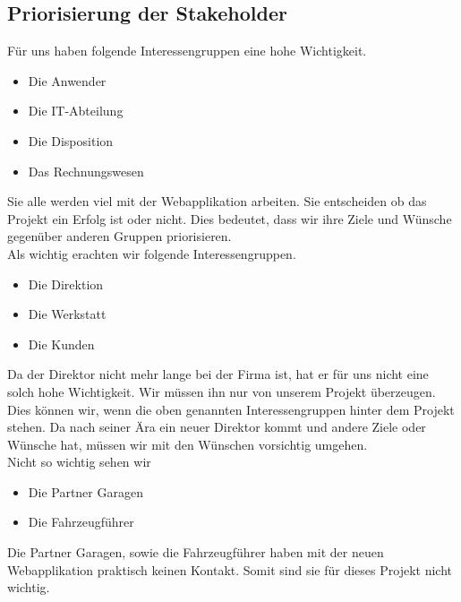 \subsection{Priorisierung der Stakeholder}
Für uns haben folgende Interessengruppen eine hohe Wichtigkeit.
\begin{itemize}
\item Die Anwender
\item Die IT-Abteilung
\item Die Disposition
\item Das Rechnungswesen
\end{itemize}
%
Sie alle werden viel mit der Webapplikation arbeiten. Sie entscheiden ob das Projekt ein Erfolg ist oder nicht. Dies bedeutet, dass wir ihre Ziele und Wünsche gegenüber anderen Gruppen priorisieren.\\[2ex]
%
Als wichtig erachten wir folgende Interessengruppen.
\begin{itemize}
\item Die Direktion
\item Die Werkstatt
\item Die Kunden
\end{itemize}
%
Da der Direktor nicht mehr lange bei der Firma ist, hat er für uns nicht eine solch hohe Wichtigkeit. Wir müssen ihn nur von unserem Projekt überzeugen. Dies können wir, wenn die oben genannten Interessengruppen hinter dem Projekt stehen. Da nach seiner Ära ein neuer Direktor kommt und andere Ziele oder Wünsche hat, müssen wir mit den Wünschen vorsichtig umgehen.\\[2ex]
%
Nicht so wichtig sehen wir
\begin{itemize}
\item Die Partner Garagen
\item Die Fahrzeugführer
\end{itemize}
%
Die Partner Garagen, sowie die Fahrzeugführer haben mit der neuen Webapplikation praktisch keinen Kontakt. Somit sind sie für dieses Projekt nicht wichtig.